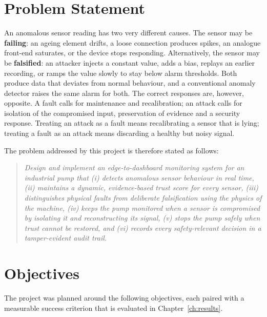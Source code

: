 \section{Problem Statement}

An anomalous sensor reading has two very different causes. The sensor may be \textbf{failing}: an ageing element drifts, a loose connection produces spikes, an analogue front-end saturates, or the device stops responding. Alternatively, the sensor may be \textbf{falsified}: an attacker injects a constant value, adds a bias, replays an earlier recording, or ramps the value slowly to stay below alarm thresholds. Both produce data that deviates from normal behaviour, and a conventional anomaly detector raises the same alarm for both. The correct responses are, however, opposite. A fault calls for maintenance and recalibration; an attack calls for isolation of the compromised input, preservation of evidence and a security response. Treating an attack as a fault means recalibrating a sensor that is lying; treating a fault as an attack means discarding a healthy but noisy signal.

The problem addressed by this project is therefore stated as follows:

\begin{quote}
\emph{Design and implement an edge-to-dashboard monitoring system for an industrial pump that (i) detects anomalous sensor behaviour in real time, (ii) maintains a dynamic, evidence-based trust score for every sensor, (iii) distinguishes physical faults from deliberate falsification using the physics of the machine, (iv) keeps the pump monitored when a sensor is compromised by isolating it and reconstructing its signal, (v) stops the pump safely when trust cannot be restored, and (vi) records every safety-relevant decision in a tamper-evident audit trail.}
\end{quote}

\section{Objectives}

The project was planned around the following objectives, each paired with a measurable success criterion that is evaluated in Chapter~\ref{ch:results}.

